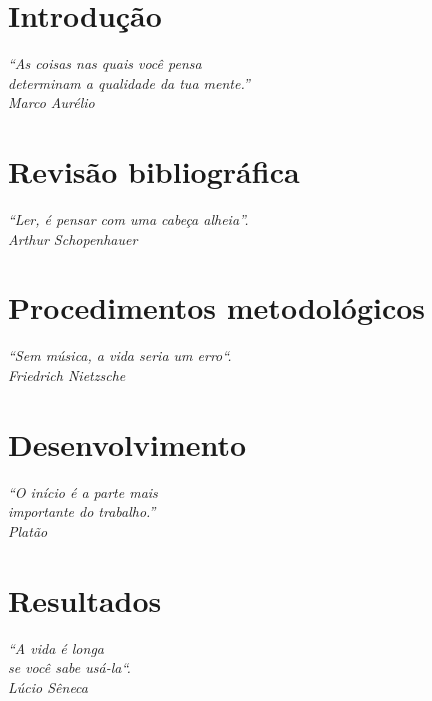 \documentclass[
	11pt,
	openright,
	oneside,
	a4paper,
	english,
	french,
	spanish,
	brazil,	
	]{abntex2}
\newcommand{\quot}[1]{\begin{flushright} \textit{#1}\end{flushright}}
\begin{document}
\renewcommand*{\insertchapterspace}{} 

\listoffigures*
\cleardoublepage

\listoftables*
\cleardoublepage







\textual

\chapter[Introdução]{Introdução}
\quot{``As coisas nas quais você pensa\\determinam a qualidade da tua mente.''\\Marco Aurélio}
\label{chapter:introducao}


\chapter{Revisão bibliográfica}
\quot{``Ler, é pensar com uma cabeça alheia''.\\Arthur Schopenhauer}
\label{chapter:metodologia}


\chapter{Procedimentos metodológicos}
\quot{``Sem música, a vida seria um erro``. \\Friedrich Nietzsche}
\label{chapter:procedimentos_metodologicos}


\chapter{Desenvolvimento}
\quot{``O início é a parte mais\\ importante do trabalho.''\\Platão}
\label{chapter:desenvolvimento}


\chapter{Resultados}
\quot{``A vida é longa\\se você sabe usá-la``.\\Lúcio Sêneca}
\label{chapter:resultados}

\end{document}
